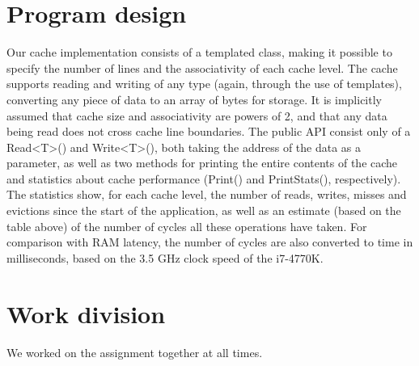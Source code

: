 \documentclass[10pt,a4paper,oneside]{article}
\begin{document}
\section{Program design}
Our cache implementation consists of a templated class, making it possible to specify the number of lines and the associativity of each cache level. The cache supports reading and writing of any type (again, through the use of templates), converting any piece of data to an array of bytes for storage. It is implicitly assumed that cache size and associativity are powers of 2, and that any data being read does not cross cache line boundaries. The public API consist only of a Read\textless T\textgreater() and Write\textless T\textgreater(), both taking the address of the data as a parameter, as well as two methods for printing the entire contents of the cache and statistics about cache performance (Print() and PrintStats(), respectively). The statistics show, for each cache level, the number of reads, writes, misses and evictions since the start of the application, as well as an estimate (based on the table above) of the number of cycles all these operations have taken. For comparison with RAM latency, the number of cycles are also converted to time in milliseconds, based on the 3.5 GHz clock speed of the i7-4770K.

\section{Work division}
We worked on the assignment together at all times.
\end{document}
